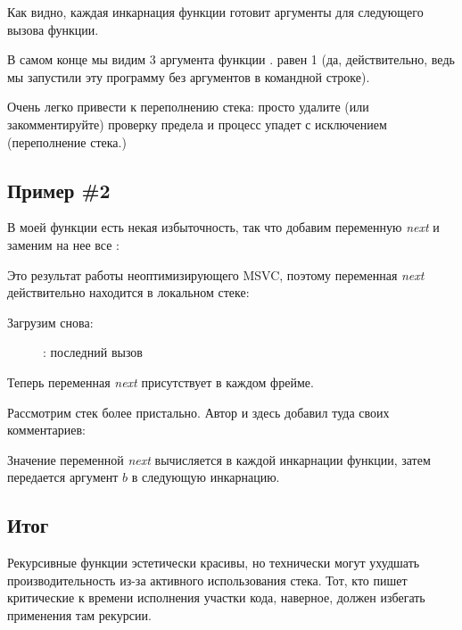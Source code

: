 
Как видно, каждая инкарнация функции готовит аргументы для следующего вызова функции.

В самом конце мы видим 3 аргумента функции \main. 
 равен 1 (да, действительно, ведь мы запустили эту программу
без аргументов в командной строке).

Очень легко привести к переполнению стека: просто удалите (или закомментируйте) проверку
предела и процесс упадет с исключением  (переполнение стека.)

\subsection{Пример \#2}

В моей функции есть некая избыточность, так что добавим переменную \emph{next} и заменим на нее
все :



Это результат работы неоптимизирующего MSVC, поэтому переменная \emph{next} действительно
находится в локальном стеке:



\clearpage
Загрузим \olly снова:

\begin{figure}[H]
\centering
{}
\caption{\olly: последний вызов \ttf{}}
\label{fig:fib_olly2}
\end{figure}

Теперь переменная \emph{next} присутствует в каждом фрейме.

\clearpage
Рассмотрим стек более пристально. Автор и здесь добавил туда своих комментариев:



Значение переменной \emph{next} вычисляется в каждой инкарнации функции, затем передается
аргумент $b$ в следующую инкарнацию.

\subsection{Итог}

\label{Recursion_and_tail_call}
\myindex{\Recursion}
Рекурсивные функции эстетически красивы, но технически могут ухудшать производительность
из-за активного использования стека.
Тот, кто пишет критические к времени исполнения участки кода, наверное, должен избегать 
применения там рекурсии.

